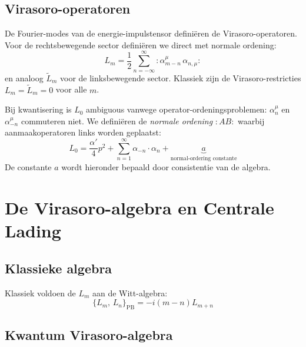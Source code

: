 \documentclass[12pt,a4paper]{article}
\begin{document}
        \subsection{Virasoro-operatoren}

            De Fourier-modes van de energie-impulstensor defini\"eren de Virasoro-operatoren. Voor de rechtsbewegende sector defini\"eren we direct met normale ordening:
            \begin{equation}
                L_m = \frac{1}{2}\sum_{n=-\infty}^{\infty} :\!\alpha_{m-n}^\mu\,\alpha_{n,\mu}\!:
                \label{eq:Lm_klassiek}
            \end{equation}
            en analoog $\tilde L_m$ voor de linksbewegende sector. Klassiek zijn de Virasoro-restricties $L_m = \tilde L_m = 0$ voor alle $m$.

            Bij kwantisering is $L_0$ ambiguous vanwege operator-ordeningsproblemen: $\alpha_n^\mu$ en $\alpha_{-n}^\mu$ commuteren niet. We defini\"eren de \emph{normale ordening} $:AB:$ waarbij aanmaakoperatoren links worden geplaatst:
            \begin{equation}
                L_0 = \frac{\alpha'}{4}p^2 + \sum_{n=1}^{\infty}\alpha_{-n}\cdot\alpha_n + \underbrace{a}_{\text{normal-ordering constante}}
            \end{equation}
            De constante $a$ wordt hieronder bepaald door consistentie van de algebra.

    \section{De Virasoro-algebra en Centrale Lading}

        \subsection{Klassieke algebra}

            Klassiek voldoen de $L_m$ aan de Witt-algebra:
            \begin{equation}
                \{L_m,\,L_n\}_{\mathrm{PB}} = -i(m-n)L_{m+n}
            \end{equation}

        \subsection{Kwantum Virasoro-algebra}
\end{document}
